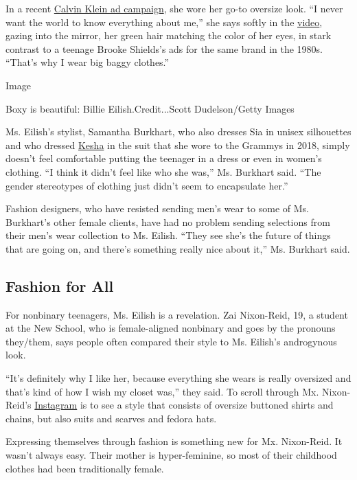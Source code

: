 In a recent \href{https://www.youtube.com/watch?v=JeMmUglv6wA}{Calvin
Klein ad campaign}, she wore her go-to oversize look. ``I never want the
world to know everything about me,'' she says softly in the
\href{https://twitter.com/CalvinKlein/status/1126937436477632512}{video},
gazing into the mirror, her green hair matching the color of her eyes,
in stark contrast to a teenage Brooke Shields's ads for the same brand
in the 1980s. ``That's why I wear big baggy clothes.''

Image

Boxy is beautiful: Billie Eilish.Credit...Scott Dudelson/Getty Images

Ms. Eilish's stylist, Samantha Burkhart, who also dresses Sia in unisex
silhouettes and who dressed
\href{https://people.com/style/kesha-grammys-2018-suit/}{Kesha} in the
suit that she wore to the Grammys in 2018, simply doesn't feel
comfortable putting the teenager in a dress or even in women's clothing.
``I think it didn't feel like who she was,'' Ms. Burkhart said. ``The
gender stereotypes of clothing just didn't seem to encapsulate her.''

Fashion designers, who have resisted sending men's wear to some of Ms.
Burkhart's other female clients, have had no problem sending selections
from their men's wear collection to Ms. Eilish. ``They see she's the
future of things that are going on, and there's something really nice
about it,'' Ms. Burkhart said.

\hypertarget{fashion-for-all}{%
\subsection{Fashion for All}\label{fashion-for-all}}

For nonbinary teenagers, Ms. Eilish is a revelation. Zai Nixon-Reid, 19,
a student at the New School, who is female-aligned nonbinary and goes by
the pronouns they/them, says people often compared their style to Ms.
Eilish's androgynous look.

``It's definitely why I like her, because everything she wears is really
oversized and that's kind of how I wish my closet was,'' they said. To
scroll through Mx. Nixon-Reid's
\href{https://www.instagram.com/pixieshawty/}{Instagram} is to see a
style that consists of oversize buttoned shirts and chains, but also
suits and scarves and fedora hats.

Expressing themselves through fashion is something new for Mx.
Nixon-Reid. It wasn't always easy. Their mother is hyper-feminine, so
most of their childhood clothes had been traditionally female.

